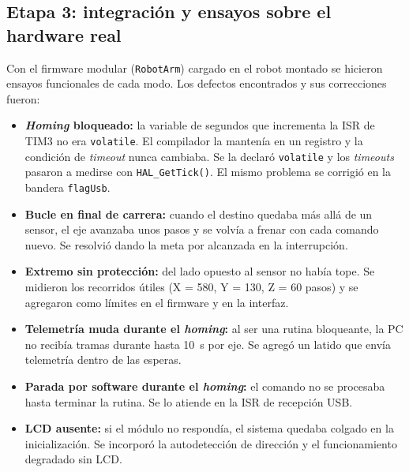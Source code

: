 \subsection{Etapa 3: integración y ensayos sobre el hardware real}
Con el firmware modular (\texttt{RobotArm}) cargado en el robot montado se hicieron ensayos
funcionales de cada modo. Los defectos encontrados y sus correcciones fueron:
\begin{itemize}
  \item \textbf{\emph{Homing} bloqueado:} la variable de segundos que incrementa la ISR de TIM3
        no era \texttt{volatile}. El compilador la mantenía en un registro y la condición de
        \emph{timeout} nunca cambiaba. Se la declaró \texttt{volatile} y los \emph{timeouts}
        pasaron a medirse con \texttt{HAL\_GetTick()}. El mismo problema se corrigió en la bandera
        \texttt{flagUsb}.
  \item \textbf{Bucle en final de carrera:} cuando el destino quedaba más allá de un sensor,
        el eje avanzaba unos pasos y se volvía a frenar con cada comando nuevo. Se resolvió
        dando la meta por alcanzada en la interrupción.
  \item \textbf{Extremo sin protección:} del lado opuesto al sensor no había tope. Se midieron
        los recorridos útiles (X = 580, Y = 130, Z = 60 pasos) y se agregaron como límites en el
        firmware y en la interfaz.
  \item \textbf{Telemetría muda durante el \emph{homing}:} al ser una rutina bloqueante, la PC
        no recibía tramas durante hasta \SI{10}{\second} por eje. Se agregó un latido que envía
        telemetría dentro de las esperas.
  \item \textbf{Parada por software durante el \emph{homing}:} el comando  no se
        procesaba hasta terminar la rutina. Se lo atiende en la ISR de recepción USB.
  \item \textbf{LCD ausente:} si el módulo no respondía, el sistema quedaba colgado en la
        inicialización. Se incorporó la autodetección de dirección y el funcionamiento degradado
        sin LCD.
\end{itemize}


